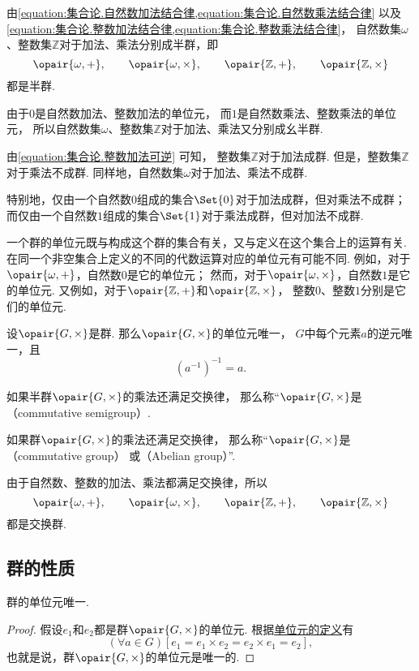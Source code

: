 由\cref{equation:集合论.自然数加法结合律,equation:集合论.自然数乘法结合律}
以及\cref{equation:集合论.整数加法结合律,equation:集合论.整数乘法结合律}，
自然数集\(\omega\)、整数集\(\mathbb{Z}\)对于加法、乘法分别成半群，即\[
	\opair{\omega,+}, \qquad
	\opair{\omega,\times}, \qquad
	\opair{\mathbb{Z},+}, \qquad
	\opair{\mathbb{Z},\times}
\]都是半群.

由于\(0\)是自然数加法、整数加法的单位元，
而\(1\)是自然数乘法、整数乘法的单位元，
所以自然数集\(\omega\)、整数集\(\mathbb{Z}\)对于加法、乘法又分别成幺半群.

由\cref{equation:集合论.整数加法可逆} 可知，
整数集\(\mathbb{Z}\)对于加法成群.
但是，整数集\(\mathbb{Z}\)对于乘法不成群.
同样地，自然数集\(\omega\)对于加法、乘法不成群.

特别地，仅由一个自然数\(0\)组成的集合\(\Set{0}\)对于加法成群，但对乘法不成群；
而仅由一个自然数\(1\)组成的集合\(\Set{1}\)对于乘法成群，但对加法不成群.

一个群的单位元既与构成这个群的集合有关，又与定义在这个集合上的运算有关.
在同一个非空集合上定义的不同的代数运算对应的单位元有可能不同.
例如，对于\(\opair{\omega,+}\)，自然数\(0\)是它的单位元；
然而，对于\(\opair{\omega,\times}\)，自然数\(1\)是它的单位元.
又例如，对于\(\opair{\mathbb{Z},+}\)和\(\opair{\mathbb{Z},\times}\)，
整数\(0\)、整数\(1\)分别是它们的单位元.

\begin{property}
设\(\opair{G,\times}\)是群.
那么\(\opair{G,\times}\)的单位元唯一，
\(G\)中每个元素\(a\)的逆元唯一，且\[
    (a^{-1})^{-1} = a.
\]
\end{property}

\begin{definition}
如果半群\(\opair{G,\times}\)的乘法还满足交换律，
那么称“\(\opair{G,\times}\)是（commutative semigroup）.
\end{definition}

\begin{definition}
如果群\(\opair{G,\times}\)的乘法还满足交换律，
那么称“\(\opair{G,\times}\)是（commutative group）%
或（Abelian group）”.
\end{definition}

由于自然数、整数的加法、乘法都满足交换律，所以\[
	\opair{\omega,+}, \qquad
	\opair{\omega,\times}, \qquad
	\opair{\mathbb{Z},+}, \qquad
	\opair{\mathbb{Z},\times}
\]都是交换群.

\subsection{群的性质}
\begin{theorem}\label{theorem:抽象代数.群内单位元唯一}
群的单位元唯一.
\begin{proof}
假设\(e_1\)和\(e_2\)都是群\(\opair{G,\times}\)的单位元.
根据\hyperref[definition:抽象代数.幺半群的定义]{单位元的定义}有\[
	(\forall a \in G)[
		e_1 = e_1 \times e_2 = e_2 \times e_1 = e_2
	],
\]
也就是说，群\(\opair{G,\times}\)的单位元是唯一的.
\end{proof}
\end{theorem}

